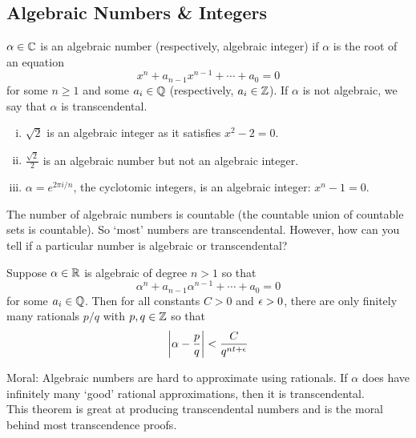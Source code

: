 \newpage
\subsection{Algebraic Numbers \& Integers\label{sec:620_1}}

\begin{dfn}
$\alpha \in \mathbb{C}$ is an algebraic number (respectively, algebraic integer) if $\alpha$ is the root of an equation
	\[
	x^n + a_{n-1} x^{n-1} + \cdots + a_0= 0
	\] 
for some $n \geq 1$ and some $a_i \in \mathbb{Q}$ (respectively, $a_i \in \mathbb{Z}$). If $\alpha$ is not algebraic, we say that $\alpha$ is transcendental. 
\end{dfn}

\begin{ex} \hfill
\begin{enumerate}[(i)]
\item $\sqrt{2}$ is an algebraic integer as it satisfies $x^2-2=0$.
\item $\frac{\sqrt{2}}{2}$ is an algebraic number but not an algebraic integer.
\item $\alpha=e^{2\pi i/n}$, the cyclotomic integers, is an algebraic integer: $x^n-1=0$.
\end{enumerate}
\end{ex}

\tb The number of algebraic numbers is countable (the countable union of countable sets is countable). So `most' numbers are transcendental. However, how can you tell if a particular number is algebraic or transcendental? 

\begin{thm}[Liouville]
Suppose $\alpha \in \mathbb{R}$ is algebraic of degree $n>1$ so that
	\[
	\alpha^n + a_{n-1} \alpha^{n-1} + \cdots + a_0 = 0
	\]
for some $a_i \in \mathbb{Q}$. Then for all constants $C>0$ and $\epsilon >0$, there are only finitely many rationals $p/q$ with $p,q \in \mathbb{Z}$ so that
	\[
	\left| \alpha - \dfrac{p}{q} \right| < \dfrac{C}{q^{nt+\epsilon}}
	\]
\end{thm}

\tb Moral: Algebraic numbers are hard to approximate using rationals. If $\alpha$ does have infinitely many `good' rational approximations, then it is transcendental. \\

\tb This theorem is great at producing transcendental numbers and is the moral behind most transcendence proofs. 

